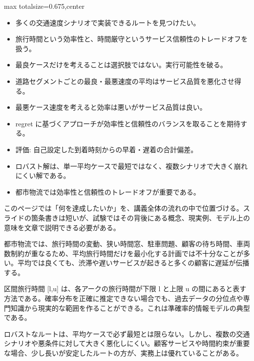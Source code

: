 \clearpage
{}
\begin{adjustbox}{max totalsize={\textwidth}{0.675\textheight},center}
\begin{minipage}{\textwidth}\scriptsize
\begin{minipage}[t]{0.485\textwidth}
\begin{itemize}
\item 多くの交通速度シナリオで実装できるルートを見つけたい。
\item 旅行時間という効率性と、時間厳守というサービス信頼性のトレードオフを扱う。
\item 最良ケースだけを考えることは選択肢ではない。実行可能性を破る。
\item 道路セグメントごとの最良・最悪速度の平均はサービス品質を悪化させ得る。
\item 最悪ケース速度を考えると効率は悪いがサービス品質は良い。
\item regret に基づくアプローチが効率性と信頼性のバランスを取ることを期待する。
\item 評価: 自己設定した到着時刻からの早着・遅着の合計偏差。
\end{itemize}
\begin{itemize}
\item ロバスト解は、単一平均ケースで最短ではなく、複数シナリオで大きく崩れにくい解である。
\item 都市物流では効率性と信頼性のトレードオフが重要である。
\end{itemize}
\end{minipage}\hfill
\begin{minipage}[t]{0.485\textwidth}
このページでは「何を達成したいか」を、講義全体の流れの中で位置づける。スライドの箇条書きは短いが、試験ではその背後にある概念、現実例、モデル上の意味を文章で説明できる必要がある。\par
都市物流では、旅行時間の変動、狭い時間窓、駐車問題、顧客の待ち時間、車両数制約が重なるため、平均旅行時間だけを最小化する計画では不十分なことが多い。平均では良くても、渋滞や遅いサービスが起きると多くの顧客に遅延が伝播する。\par
区間旅行時間 [l,u] は、各アークの旅行時間が下限 l と上限 u の間にあると表す方法である。確率分布を正確に推定できない場合でも、過去データの分位点や専門知識から現実的な範囲を作ることができる。これは準確率的情報モデルの典型である。\par
ロバストなルートは、平均ケースで必ず最短とは限らない。しかし、複数の交通シナリオや悪条件に対して大きく悪化しにくい。顧客サービスや時間約束が重要な場合、少し長いが安定したルートの方が、実務上は優れていることがある。\par

\end{minipage}
\end{minipage}
\end{adjustbox}
